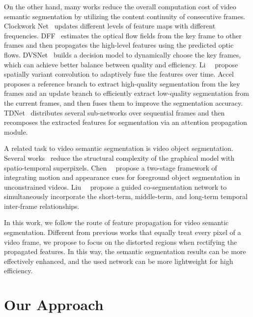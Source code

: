 \documentclass[journal]{IEEEtran}
\begin{document}
On the other hand, many works reduce the overall computation cost of video semantic segmentation by utilizing the content continuity of consecutive frames. Clockwork Net~\cite{shelhamer2016clockwork} updates different levels of feature maps with different frequencies. DFF~\cite{zhu2017deep} estimates the optical flow fields from the key frame to other frames and then propagates the high-level features using the predicted optic flows. DVSNet~\cite{xu2018dynamic} builds a decision model to dynamically choose the key frames, which can achieve better balance between quality and efficiency. Li~\etal~\cite{li2018low} propose spatially variant convolution to adaptively fuse the features over time. Accel~\cite{jain2019accel} proposes a reference branch to extract high-quality segmentation from the key frames and an update branch to efficiently extract low-quality segmentation from the current frames, and then fuses them to improve the segmentation accuracy. TDNet~\cite{hu2020temporally} distributes several sub-networks over sequential frames and then recomposes the extracted features for segmentation via an attention propagation module.

A related task to video semantic segmentation is video object segmentation. Several works~\cite{wang2005interactive,li2005video,price2009livecut} reduce the structural complexity of the graphical model with spatio-temporal superpixels. Chen~\etal~\cite{chen2019motion} propose a two-stage framework of integrating motion and appearance cues for foreground object segmentation in unconstrained videos. Liu~\etal~\cite{liu2020guided} propose a guided co-segmentation network to simultaneously incorporate the short-term, middle-term, and long-term temporal inter-frame relationships.

In this work, we follow the route of feature propagation for video semantic segmentation. Different from previous works that equally treat every pixel of a video frame, we propose to focus on the distorted regions when rectifying the propagated features. In this way, the semantic segmentation results can be more effectively enhanced, and the used network can be more lightweight for high efficiency.


\section{Our Approach} \label{sec:approach}
\end{document}
